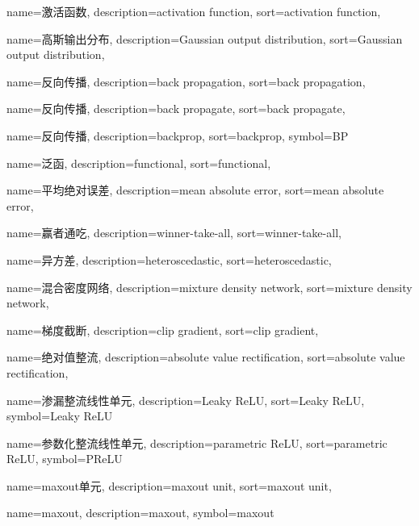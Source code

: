 {
  name=激活函数,
  description={activation function},
  sort={activation function},
}

{
  name=高斯输出分布,
  description={Gaussian output distribution},
  sort={Gaussian output distribution},
}

{
  name=反向传播,
  description={back propagation},
  sort={back propagation},
}

{
  name=反向传播,
  description={back propagate},
  sort={back propagate},
}

{
  name=反向传播,
  description={backprop},
  sort={backprop},
  symbol={BP}
}

{
  name=泛函,
  description={functional},
  sort={functional},
}

{
  name=平均绝对误差,
  description={mean absolute error},
  sort={mean absolute error},
}

{
  name=赢者通吃,
  description={winner-take-all},
  sort={winner-take-all},
}

{
  name=异方差,
  description={heteroscedastic},
  sort={heteroscedastic},
}

{
  name=混合密度网络,
  description={mixture density network},
  sort={mixture density network},
}

{
  name=梯度截断,
  description={clip gradient},
  sort={clip gradient},
}

{
  name=绝对值整流,
  description={absolute value rectification},
  sort={absolute value rectification},
}

{
  name=渗漏整流线性单元,
  description={Leaky ReLU},
  sort={Leaky ReLU},
  symbol={Leaky ReLU}
}

{
  name=参数化整流线性单元,
  description={parametric ReLU},
  sort={parametric ReLU},
  symbol={PReLU}
}

{
  name=maxout单元,
  description={maxout unit},
  sort={maxout unit},
}

{
  name=maxout,
  description={maxout},
  symbol={maxout}
}

